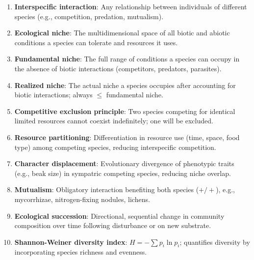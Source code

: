 \documentclass[11pt]{article}
\begin{document}
\clearpage


\begin{tcolorbox}[enhanced,colback=green!20,colframe=green!60!black,
  arc=6pt,boxrule=1.2pt,title=\textbf{\large Answer Key --- Part A: Definitions},
  fonttitle=\bfseries,coltitle=black,breakable]
\begin{enumerate}[label=\textbf{\arabic*.},leftmargin=*]
  \item \textbf{Interspecific interaction}: Any relationship between individuals of different species (e.g., competition, predation, mutualism).
  \item \textbf{Ecological niche}: The multidimensional space of all biotic and abiotic conditions a species can tolerate and resources it uses.
  \item \textbf{Fundamental niche}: The full range of conditions a species can occupy in the absence of biotic interactions (competitors, predators, parasites).
  \item \textbf{Realized niche}: The actual niche a species occupies after accounting for biotic interactions; always $\leq$ fundamental niche.
  \item \textbf{Competitive exclusion principle}: Two species competing for identical limited resources cannot coexist indefinitely; one will be excluded.
  \item \textbf{Resource partitioning}: Differentiation in resource use (time, space, food type) among competing species, reducing interspecific competition.
  \item \textbf{Character displacement}: Evolutionary divergence of phenotypic traits (e.g., beak size) in sympatric competing species, reducing niche overlap.
  \item \textbf{Mutualism}: Obligatory interaction benefiting both species ($+/+$), e.g., mycorrhizae, nitrogen-fixing nodules, lichens.
  \item \textbf{Ecological succession}: Directional, sequential change in community composition over time following disturbance or on new substrate.
  \item \textbf{Shannon-Weiner diversity index}: $H = -\sum p_i \ln p_i$; quantifies diversity by incorporating species richness and evenness.
\end{enumerate}
\end{tcolorbox}
\end{document}
